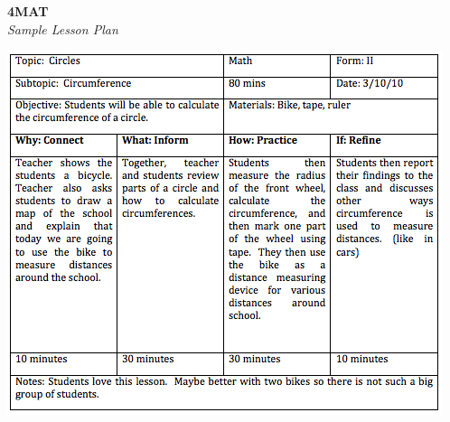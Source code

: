 \newpage
\begin{center}
\textbf{4MAT }\\
\textit{Sample Lesson Plan}
\end{center}

\begin{center}
\includegraphics[scale=.8]{./img/picture-7.png} 
\end{center}